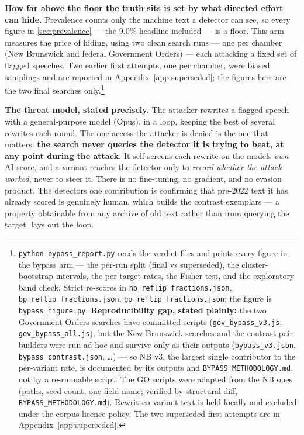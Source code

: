 \textbf{How far above the floor the truth sits is set by what directed effort can
hide.} Prevalence counts only the machine text a detector can see, so every
figure in \cref{sec:prevalence} --- the 9.0\% headline included --- is a floor. This arm measures
the price of hiding, using two clean search runs --- one per chamber (New
Brunswick and federal Government Orders) --- each attacking a fixed set of
flagged speeches. Two earlier first attempts, one per chamber,
were biased samplings and are reported in Appendix~\ref{app:superseded}; the figures here are
the two final searches only.\footnote{\texttt{python\ bypass\_\allowbreak{}report.\allowbreak{}py} reads the verdict files and prints every
  figure in the bypass arm --- the per-run split (final vs superseded), the
  cluster-bootstrap intervals, the per-target rates, the Fisher test, and the
  exploratory band check. Strict re-scores in \texttt{nb\_\allowbreak{}reflip\_\allowbreak{}fractions.\allowbreak{}json},
  \texttt{bp\_\allowbreak{}reflip\_\allowbreak{}fractions.\allowbreak{}json}, \texttt{go\_\allowbreak{}reflip\_\allowbreak{}fractions.\allowbreak{}json}; the figure is
  \texttt{bypass\_figure.py}. \textbf{Reproducibility gap, stated plainly:} the two Government Orders searches have committed scripts
  (\texttt{gov\_bypass\_v3.js}, \texttt{gov\_bypass\_all.js}), but the New Brunswick searches
  and the contrast-pair builders were run ad hoc and survive only as their
  outputs (\texttt{bypass\_v3.json}, \texttt{bypass\_contrast.json}, \ldots) --- so NB v3, the
  largest single contributor to the per-variant rate, is documented by its
  outputs and \texttt{BYPASS\_METHODOLOGY.md}, not by a re-runnable script. The GO
  scripts were adapted from the NB ones (paths, seed count, one field name;
  verified by structural diff, \texttt{BYPASS\_METHODOLOGY.md}). Rewritten variant
  text is held locally and excluded under the corpus-licence policy. The two
  superseded first attempts are in Appendix~\ref{app:superseded}.}

\textbf{The threat model, stated precisely.} The attacker rewrites a flagged speech
with a general-purpose model (Opus), in a loop, keeping the best of several
rewrites each round. The one access the attacker is denied is the one that
matters: \textbf{the search never queries the detector it is trying to beat, at any
point during the attack.} It self-screens each rewrite on the model\textquotesingle s \emph{own}
AI-score, and a variant reaches the detector only to \emph{record whether the
attack worked}, never to steer it. There is no fine-tuning, no gradient, and
no evasion product. The detector\textquotesingle s one contribution is confirming that
pre-2022 text it has already scored is genuinely human, which builds the
contrast exemplars --- a property obtainable from any archive of old text
rather than from querying the target.  lays out the loop.

